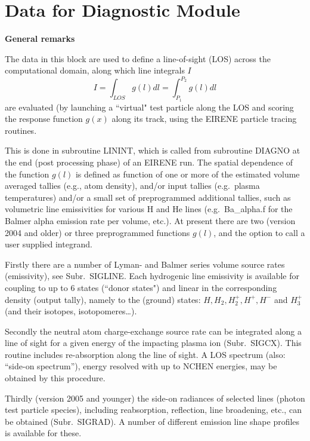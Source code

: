 \section{Data for Diagnostic Module} \label{sec2.12}

\textbf{General remarks}

\medskip

The data in this block are used to define a line-of-sight (LOS) across the
computational domain, along which line integrals $I$
\begin{equation}
  \label{eqLOS} I = \int_{LOS} g(l) dl = \int_{P_1}^{P_2} g(l) dl
\end{equation}
are evaluated (by launching a ``virtual" test particle along the LOS and
scoring the response function $g(x)$ along its track, using the EIRENE particle
tracing routines.
%

This is done in subroutine LININT, which is called from subroutine DIAGNO at
the end (post processing phase) of an EIRENE run.
The spatial dependence of the function $g(l)$ is defined as function of one or
more of the estimated volume averaged tallies (e.g., atom density), and/or
input tallies (e.g.\ plasma temperatures) and/or a small set of preprogrammed
additional tallies, such as volumetric line emissivities for various H and He
lines (e.g.\ Ba\_alpha.f for the Balmer alpha emission rate per volume, etc.).
At present there are two (version 2004 and older) or three preprogrammed
functions $g(l)$, and the option to call a user supplied integrand.

Firstly there are a number of Lyman- and Balmer series volume source rates
(emissivity), see Subr.\ SIGLINE.
Each hydrogenic line emissivity is available for coupling to up to 6 states
(``donor states") and linear in the corresponding density (output tally),
namely to the (ground) states:
$H, H_2, H_2^+, H^+, H^-$ and $H_3^+$	(and their isotopes,
isotopomeres\dots).

Secondly the neutral atom charge-exchange source rate can be integrated along a
line of sight for a given energy of the impacting plasma ion (Subr.\ SIGCX).
This routine includes re-absorption along the line of sight.
A LOS spectrum (also: ``side-on spectrum''), energy resolved with up to NCHEN
energies, may be obtained by this procedure.

Thirdly (version 2005 and younger) the side-on radiances of selected lines
(photon test particle species), including reabsorption, reflection, line
broadening, etc., can be obtained (Subr.\ SIGRAD).
A number of different emission line shape profiles is available for these.

